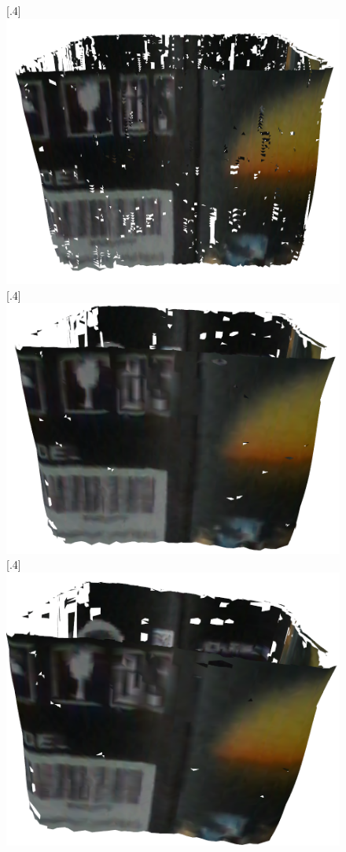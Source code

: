 \begin{figure}[H]
\centering
{}%
  [.4\linewidth]{\includegraphics[scale=0.32]{bpaBox2x.PNG}}
  [.4\linewidth]{\includegraphics[scale=0.32]{bpaBox5x.PNG}}
  [.4\linewidth]{\includegraphics[scale=0.32]{bpaBox7x.PNG}}

\end{figure}
